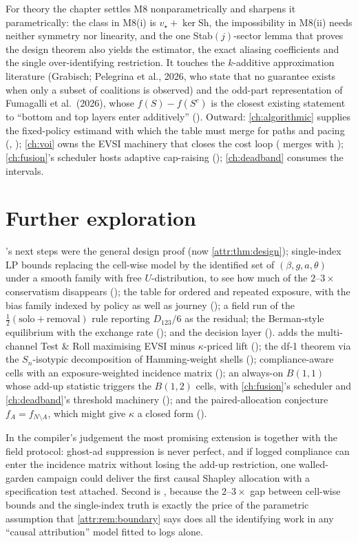 For theory the chapter settles M8 nonparametrically and sharpens it parametrically: the class in M8(i) is $v_\star + \ker\mathrm{Sh}$, the impossibility in M8(ii) needs neither symmetry nor linearity, and the one Stab$(j)$-sector lemma that proves the design theorem also yields the estimator, the exact aliasing coefficients and the single over-identifying restriction. It touches the $k$-additive approximation literature (Grabisch; Pelegrina et al., 2026, who state that no guarantee exists when only a subset of coalitions is observed) and the odd-part representation of Fumagalli et al.\ (2026), whose $f(S) - f(S^c)$ is the closest existing statement to ``bottom and top layers enter additively'' (). Outward: \cref{ch:algorithmic} supplies the fixed-policy estimand with which the table must merge for paths and pacing (, ); \cref{ch:voi} owns the EVSI machinery that closes the cost loop ( merges with ); \cref{ch:fusion}'s scheduler hosts adaptive cap-raising (); \cref{ch:deadband} consumes the intervals.

\section{Further exploration}

's next steps were the general design proof (now \cref{attr:thm:design}); single-index LP bounds replacing the cell-wise model by the identified set of $(\beta, g, a, \theta)$ under a smooth family with free $U$-distribution, to see how much of the $2$--$3\times$ conservatism disappears (); the table for ordered and repeated exposure, with the bias family indexed by policy as well as journey (); a field run of the $\tfrac12(\text{solo} + \text{removal})$ rule reporting $D_{123}/6$ as the residual; the Berman-style equilibrium with the exchange rate (); and the decision layer ().  adds the multi-channel Test \& Roll maximising EVSI minus $\kappa$-priced lift (); the df-1 theorem via the $S_n$-isotypic decomposition of Hamming-weight shells (); compliance-aware cells with an exposure-weighted incidence matrix (); an always-on $B(1,1)$ whose add-up statistic triggers the $B(1,2)$ cells, with \cref{ch:fusion}'s scheduler and \cref{ch:deadband}'s threshold machinery (); and the paired-allocation conjecture $f_A = f_{N \setminus A}$, which might give $\kappa$ a closed form ().

In the compiler's judgement the most promising extension is  together with the field protocol: ghost-ad suppression is never perfect, and if logged compliance can enter the incidence matrix without losing the add-up restriction, one walled-garden campaign could deliver the first causal Shapley allocation with a specification test attached. Second is , because the $2$--$3\times$ gap between cell-wise bounds and the single-index truth is exactly the price of the parametric assumption that \cref{attr:rem:boundary} says does all the identifying work in any ``causal attribution'' model fitted to logs alone.

